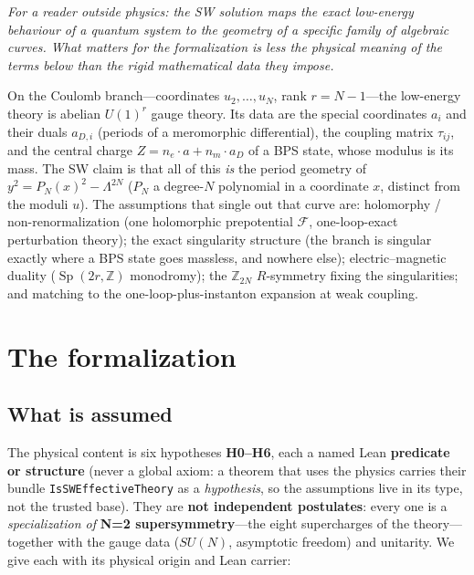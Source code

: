 \documentclass[11pt]{article}
\newcommand{\Z}{\mathbb{Z}}
\newcommand{\Sp}{\operatorname{Sp}}
\newcommand{\code}[1]{\texttt{#1}}
\begin{document}
\emph{For a reader outside physics: the SW solution maps the exact low-energy behaviour of a
quantum system to the geometry of a specific family of algebraic curves. What matters for the
formalization is less the physical meaning of the terms below than the rigid mathematical data
they impose.}

On the Coulomb branch---coordinates $u_2,\dots,u_N$, rank $r = N-1$---the low-energy theory is
abelian $U(1)^r$ gauge theory. Its data are the special coordinates $a_i$ and their duals
$a_{D,i}$ (periods of a meromorphic differential), the coupling matrix $\tau_{ij}$, and the
central charge $Z = n_e\cdot a + n_m\cdot a_D$ of a BPS state, whose modulus is its mass. The
SW claim is that all of this \emph{is} the period geometry of $y^2 = P_N(x)^2 - \Lambda^{2N}$
($P_N$ a degree-$N$ polynomial in a coordinate $x$, distinct from the moduli $u$). The
assumptions that single out that curve are: holomorphy / non-renormalization (one holomorphic
prepotential $\mathcal{F}$, one-loop-exact perturbation theory); the exact singularity
structure (the branch is singular exactly where a BPS state goes massless, and nowhere else);
electric--magnetic duality ($\Sp(2r,\Z)$ monodromy); the $\Z_{2N}$ $R$-symmetry fixing the
singularities; and matching to the one-loop-plus-instanton expansion at weak coupling.

\section{The formalization}

\subsection{What is assumed}

The physical content is six hypotheses \textbf{H0--H6}, each a named Lean \textbf{predicate or
structure} (never a global axiom: a theorem that uses the physics carries their bundle
\code{IsSWEffectiveTheory} as a \emph{hypothesis}, so the assumptions live in its type, not the
trusted base). They are \textbf{not independent postulates}: every one is a \emph{specialization of}
\textbf{N=2 supersymmetry}---the eight supercharges of the theory---together with the gauge data
($SU(N)$, asymptotic freedom) and unitarity. We give each with its physical origin and Lean carrier:
\end{document}

